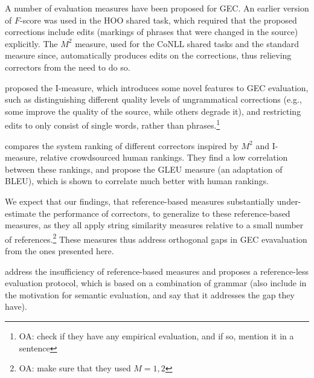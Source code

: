 \documentclass[letter,11pt]{article}
\newcommand{\oa}[1]{\footnote{\color{red}OA: #1}}
\begin{document}
A number of evaluation measures have been proposed for GEC.
An earlier version of $F$-score was used in the HOO shared task, which required that
the proposed corrections include edits (markings of phrases that were changed 
in the source) explicitly. The $M^2$ measure, used for the CoNLL shared tasks and the standard
measure since, automatically produces edits on the corrections, thus relieving correctors from
the need to do so. 

 proposed the {\sc I-measure},
which introduces some novel features to GEC evaluation, such as distinguishing
different quality levels of ungrammatical corrections (e.g., some improve the quality of
the source, while others degrade it), and restricting edits to only consist of single words,
rather than phrases.\oa{check if they have any empirical evaluation, and if so, mention it
  in a sentence}

 compares the system ranking of different correctors inspired by
$M^2$ and I-measure, relative crowdsourced human rankings. They find a low correlation between
these rankings, and propose the GLEU measure (an adaptation of BLEU), which is shown
to correlate much better with human rankings.

We expect that our findings, that reference-based measures substantially under-estimate the
performance of correctors, to generalize to these reference-based measures, as they all
apply string similarity measures relative to a small number of references.\oa{make sure
  that they used $M=1,2$}
These measures thus address orthogonal gaps in GEC evavaluation from the ones presented here.

 address the insufficiency of reference-based measures
and proposes a reference-less evaluation protocol, which is based
on a combination of grammar (also include in the motivation for semantic evaluation, and say
that it addresses the gap they have).


\end{document}
